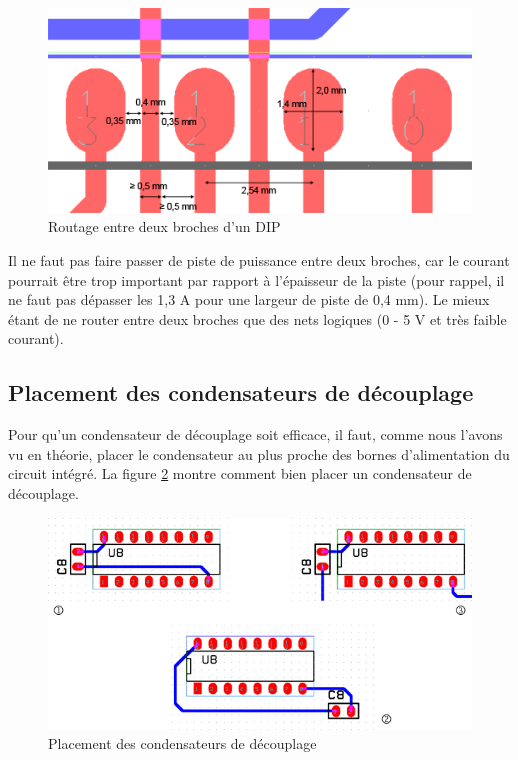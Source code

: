 \documentclass[a4paper]{article}
\begin{document}
\begin{figure}[H]
	\centering
	\includegraphics[scale=0.75]{Images/Routage_entre_broches_DIP.png}
	\caption{Routage entre deux broches d'un DIP
		\label{Routage_entre_broches_DIP}}
\end{figure}

Il ne faut pas faire passer de piste de puissance entre deux broches, car le courant pourrait être trop important par rapport à l'épaisseur de la piste (pour rappel, il ne faut pas dépasser les 1,3 A pour une largeur de piste de 0,4 mm). Le mieux étant de ne router entre deux broches que des nets logiques (0 - 5 V et très faible courant).

\subsection{Placement des condensateurs de découplage}

Pour qu'un condensateur de découplage soit efficace, il faut, comme nous l'avons vu en théorie, placer le condensateur au plus proche des bornes d'alimentation du circuit intégré. La figure \ref{Placement_condensateurs_decouplage} montre comment bien placer un condensateur de découplage.

\begin{figure}[H]
	\centering
	\includegraphics[scale=0.75]{Images/Placement_condensateurs_decouplage.png}
	\caption{Placement des condensateurs de découplage
		\label{Placement_condensateurs_decouplage}}
\end{figure}
\end{document}
